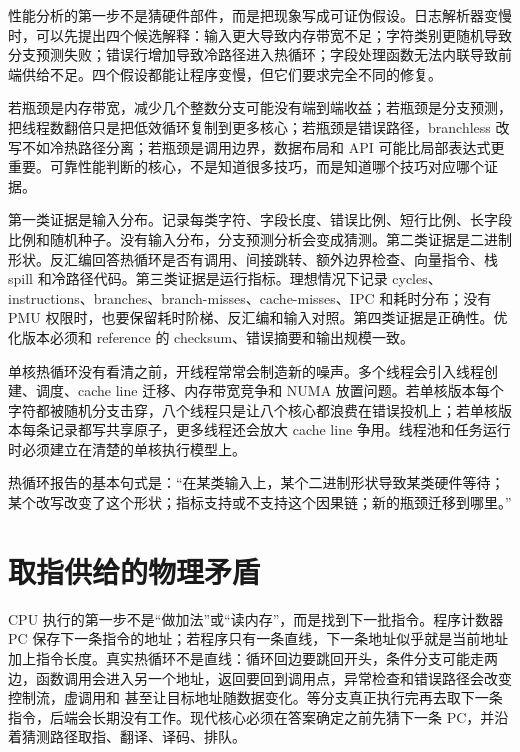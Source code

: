 性能分析的第一步不是猜硬件部件，而是把现象写成可证伪假设。日志解析器变慢时，可以先提出四个候选解释：输入更大导致内存带宽不足；字符类别更随机导致分支预测失败；错误行增加导致冷路径进入热循环；字段处理函数无法内联导致前端供给不足。四个假设都能让程序变慢，但它们要求完全不同的修复。

若瓶颈是内存带宽，减少几个整数分支可能没有端到端收益；若瓶颈是分支预测，把线程数翻倍只是把低效循环复制到更多核心；若瓶颈是错误路径，branchless 改写不如冷热路径分离；若瓶颈是调用边界，数据布局和 API 可能比局部表达式更重要。可靠性能判断的核心，不是知道很多技巧，而是知道哪个技巧对应哪个证据。

第一类证据是输入分布。记录每类字符、字段长度、错误比例、短行比例、长字段比例和随机种子。没有输入分布，分支预测分析会变成猜测。第二类证据是二进制形状。反汇编回答热循环是否有调用、间接跳转、额外边界检查、向量指令、栈 spill 和冷路径代码。第三类证据是运行指标。理想情况下记录 cycles、instructions、branches、branch-misses、cache-misses、IPC 和耗时分布；没有 PMU 权限时，也要保留耗时阶梯、反汇编和输入对照。第四类证据是正确性。优化版本必须和 reference 的 checksum、错误摘要和输出规模一致。

单核热循环没有看清之前，开线程常常会制造新的噪声。多个线程会引入线程创建、调度、cache line 迁移、内存带宽竞争和 NUMA 放置问题。若单核版本每个字符都被随机分支击穿，八个线程只是让八个核心都浪费在错误投机上；若单核版本每条记录都写共享原子，更多线程还会放大 cache line 争用。线程池和任务运行时必须建立在清楚的单核执行模型上。

\begin{keyidea}
热循环报告的基本句式是：“在某类输入上，某个二进制形状导致某类硬件等待；某个改写改变了这个形状；指标支持或不支持这个因果链；新的瓶颈迁移到哪里。”
\end{keyidea}

\section{取指供给的物理矛盾}

CPU 执行的第一步不是“做加法”或“读内存”，而是找到下一批指令。程序计数器 PC 保存下一条指令的地址；若程序只有一条直线，下一条地址似乎就是当前地址加上指令长度。真实热循环不是直线：循环回边要跳回开头，条件分支可能走两边，函数调用会进入另一个地址，返回要回到调用点，异常检查和错误路径会改变控制流，虚调用和  甚至让目标地址随数据变化。等分支真正执行完再去取下一条指令，后端会长期没有工作。现代核心必须在答案确定之前先猜下一条 PC，并沿着猜测路径取指、翻译、译码、排队。

